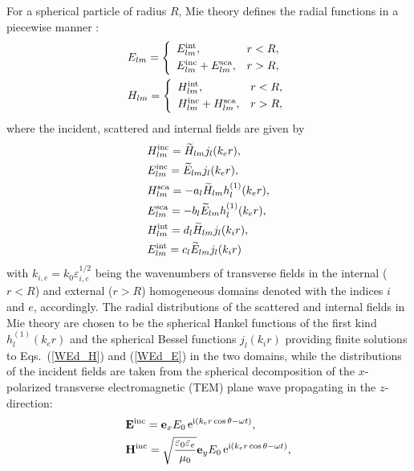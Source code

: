 \documentclass[aps,prb,reprint]{revtex4-2}
\renewcommand{\vec}[1]{{\bf #1}}
\renewcommand{\i}{{\rm i}}
\newcommand{\e}{\mathop{\rm e}\nolimits}
\begin{document}
For a spherical particle of radius $R$, Mie theory defines the radial functions in a piecewise manner \cite{Li:2014}:  
\begin{eqnarray}
	&\displaystyle 
	{E}_{lm}=\left\{
	\begin{array}{ll}
	E_{lm}^{\rm int}, & r<R,\\[3pt]
	E_{lm}^{\rm inc}+E_{lm}^{\rm sca}, & r>R,
	\end{array}
	\right.\\
	&\displaystyle 
	{H}_{lm}=\left\{
	\begin{array}{ll}
	H_{lm}^{\rm int}, & r<R,\\[3pt]
	H_{lm}^{\rm inc}+H_{lm}^{\rm sca}, & r>R,
	\end{array}
	\right.
\end{eqnarray}
where the incident, scattered and internal fields are given by
\begin{eqnarray}
	&\displaystyle 
	H_{lm}^{\rm inc}=\widetilde{H}_{lm} j_l(k_e r), \label{H_inc}\\
	&\displaystyle
	E_{lm}^{\rm inc}=\widetilde{E}_{lm} j_l(k_e r), \label{E_inc}\\
	&\displaystyle 
	H_{lm}^{\rm sca}=-a_{l} \widetilde{H}_{lm} h_l^{(1)}(k_e r), \label{H_sca}\\
	&\displaystyle 
	E_{lm}^{\rm sca}=-b_{l} \widetilde{E}_{lm} h_l^{(1)}(k_e r),\label{E_sca}\\
	&\displaystyle 
	H_{lm}^{\rm int}= d_{l} \widetilde{H}_{lm} j_l(k_i r),\label{H_int}\\
	&\displaystyle 
	E_{lm}^{\rm int}= c_{l} \widetilde{E}_{lm} j_l(k_i r)\label{E_int}
\end{eqnarray}
with $k_{i,e}=k_0\varepsilon_{i,e}^{1/2}$ being the wavenumbers of transverse fields in the internal ($r<R$) and external ($r>R$) homogeneous domains denoted with the indices $i$ and $e$, accordingly. The radial distributions of the scattered and internal fields in Mie theory are chosen to be the spherical Hankel functions of the first kind $h_l^{(1)}(k_e r)$ and the spherical Bessel functions $j_l(k_i r)$ providing finite solutions to Eqs.~(\ref{WEd_H}) and (\ref{WEd_E}) in the two domains, while the distributions of the incident fields are taken from the spherical decomposition of the $x$-polarized transverse electromagnetic (TEM) plane wave propagating in the $z$-direction: 
\begin{eqnarray}
	&\displaystyle 
	{\vec E}^{\rm inc}=
		{\vec e}_x
	E_0\e ^{\i (k_e r \cos\theta-\omega t)},
\\
	&\displaystyle 
	{\vec H}^{\rm inc}=\sqrt\frac{\varepsilon_0\varepsilon_e}{\mu_0}
		{\vec e}_y
	E_0\e^{\i (k_e r \cos\theta-\omega t)},
\end{eqnarray}
\end{document}
